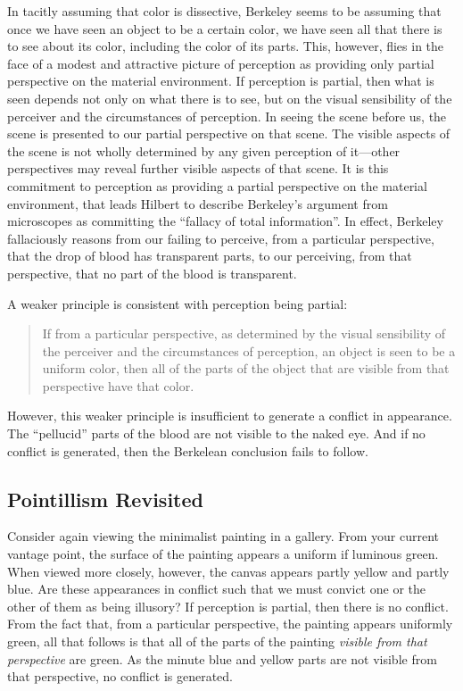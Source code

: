 \documentclass[12pt]{article}
\begin{document}
In tacitly assuming that color is dissective, Berkeley seems to be assuming that once we have seen an object to be a certain color, we have seen all that there is to see about its color, including the color of its parts. This, however, flies in the face of a modest and attractive picture of perception as providing only partial perspective on the material environment. If perception is partial, then what is seen depends not only on what there is to see, but on the visual sensibility of the perceiver and the circumstances of perception. In seeing the scene before us, the scene is presented to our partial perspective on that scene. The visible aspects of the scene is not wholly determined by any given perception of it---other perspectives may reveal further visible aspects of that scene. It is this commitment to perception as providing a partial perspective on the material environment, that leads Hilbert to describe Berkeley's argument from microscopes as committing the ``fallacy of total information''. In effect, Berkeley fallaciously reasons from our failing to perceive, from a particular perspective, that the drop of blood has transparent parts, to our perceiving, from that perspective, that no part of the blood is transparent.

A weaker principle is consistent with perception being partial:
\begin{quote}
	If from a particular perspective, as determined by the visual sensibility of the perceiver and the circumstances of perception, an object is seen to be a uniform color, then all of the parts of the object that are visible from that perspective have that color.
\end{quote}
However, this weaker principle is insufficient to generate a conflict in appearance. The ``pellucid'' parts of the blood are not visible to the naked eye. And if no conflict is generated, then the Berkelean conclusion fails to follow.


\subsection{Pointillism Revisited}\label{sub:pointillism_revisited} %

Consider again viewing the minimalist painting in a gallery. From your current vantage point, the surface of the painting appears a uniform if luminous green. When viewed more closely, however, the canvas appears partly yellow and partly blue. Are these appearances in conflict such that we must convict one or the other of them as being illusory? If perception is partial, then there is no conflict. From the fact that, from a particular perspective, the painting appears uniformly green, all that follows is that all of the parts of the painting \emph{visible from that perspective} are green. As the minute blue and yellow parts are not visible from that perspective, no conflict is generated.
\end{document}

